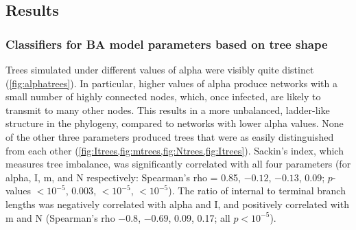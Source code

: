 
\subsection{Results}

\subsubsection*{Classifiers for BA model parameters based on tree shape}



Trees simulated under different values of \gls{alpha} were visibly quite
distinct (\cref{fig:alphatrees}). In particular, higher values of \gls{alpha}
produce networks with a small number of highly connected nodes, which, once
infected, are likely to transmit to many other nodes. This results in a more
unbalanced, ladder-like structure in the phylogeny, compared to networks with
lower \gls{alpha} values. None of the other three parameters produced trees
that were as easily distinguished from each other
(\cref{fig:Itrees,fig:mtrees,fig:Ntrees,fig:Itrees}).  Sackin's index, which
measures tree imbalance, was significantly correlated with all four parameters
    (for \gls{alpha}, \gls{I}, \gls{m}, and \gls{N} respectively: Spearman's rho =
    0.85,
     \ensuremath{-0.12},
     \ensuremath{-0.13},
     0.09;
     $p$-values
     ${<}10^{-5}$,
     $0.003$,
     ${<}10^{-5}$,
     ${<}10^{-5}$).
The ratio of internal to terminal branch lengths was negatively correlated with
\gls{alpha} and \gls{I}, and positively correlated with \gls{m} and \gls{N}
  (Spearman's rho
    \ensuremath{-0.8},
    \ensuremath{-0.69},
    0.09,
    0.17;
all $p < 10^{-5}$).

